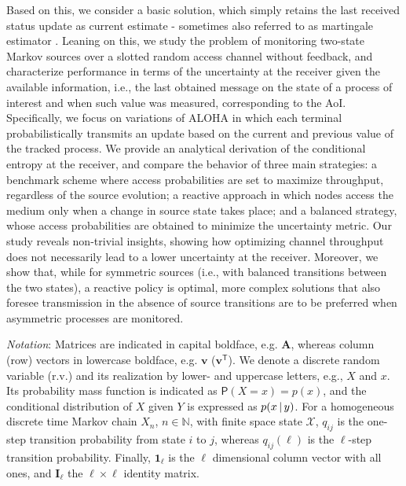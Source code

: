 Based on this, we consider a basic solution, which simply retains the last received status update as current estimate \-- sometimes also referred to as martingale estimator \cite{Ulukus24_Martingale,Munari23_Asilomar}. Leaning on this, we study the problem of monitoring two-state Markov sources over a slotted random access channel without feedback, and characterize performance in terms of the uncertainty at the receiver given the available information, i.e., the last obtained message on the state of a process of interest and when such value was measured, corresponding to the AoI. Specifically, we focus on variations of ALOHA in which each terminal probabilistically transmits an update based on the current and previous value of the tracked process. We provide an analytical derivation of the conditional entropy at the receiver, and compare the behavior of three main strategies: a benchmark scheme where access probabilities are set to maximize throughput, regardless of the source evolution; a reactive approach in which nodes access the medium only when a change in source state takes place; and a balanced strategy, whose access probabilities are obtained to minimize the uncertainty metric. Our study reveals non-trivial insights, showing how optimizing channel throughput does not necessarily lead to a lower uncertainty at the receiver. Moreover, we show that, while for symmetric sources (i.e., with balanced transitions between the two states), a reactive policy is optimal, more complex solutions that also foresee transmission in the absence of source transitions are to be preferred when asymmetric processes are monitored.

\emph{Notation}: Matrices are indicated in capital boldface, e.g. $\mathbf A$, whereas column (row) vectors in lowercase boldface, e.g. $\mathbf v$ ($\mathbf v^{\mathsf T}$). We denote a discrete random variable (r.v.) and its realization by lower- and uppercase letters, e.g., $X$ and $x$. Its probability mass function is indicated as \mbox{$\mathsf P(X=x) = p(x)$}, and the conditional distribution of $X$ given $Y$ is expressed as $p(x\, | \, y)$. For a homogeneous discrete time Markov chain $X_n$, $n\in\mathbb N$, with finite space state $\mathcal X$, $q_{ij}$ is the one-step transition probability from state $i$ to $j$, whereas $q_{ij}(\ell)$ is the $\ell$-step transition probability. Finally, $\mathbf 1_\ell$ is the $\ell$ dimensional column vector with all ones, and $\mathbf I_\ell$ the $\ell\times\ell$ identity matrix.%



